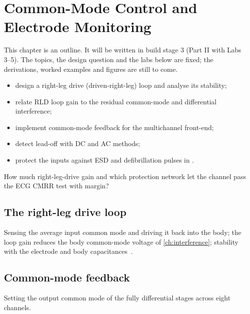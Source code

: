 \chapter{Common-Mode Control and Electrode Monitoring}\label{ch:cmcontrol}

\begin{specnote}
This chapter is an outline. It will be written in build stage 3 (Part II with Labs 3--5). The topics, the design question and the labs below are fixed; the derivations, worked examples and figures are still to come.
\end{specnote}

\begin{objectives}
\begin{itemize}
  \item design a right-leg drive (driven-right-leg) loop and analyse its stability;
  \item relate RLD loop gain to the residual common-mode and differential interference;
  \item implement common-mode feedback for the multichannel front-end;
  \item detect lead-off with DC and AC methods;
  \item protect the inputs against ESD and defibrillation pulses in \sgx{}.
\end{itemize}
\end{objectives}

\begin{insight}
How much right-leg-drive gain and which protection network let the \OB{} channel pass the ECG CMRR test with margin?
\end{insight}

\section{The right-leg drive loop}\label{sec:ch12-1}
Sensing the average input common mode and driving it back into the body; the loop gain reduces the body common-mode voltage of \cref{ch:interference}; stability with the electrode and body capacitances~\cite{winter1983}.

\section{Common-mode feedback}\label{sec:ch12-2}
Setting the output common mode of the fully differential stages across eight channels.

